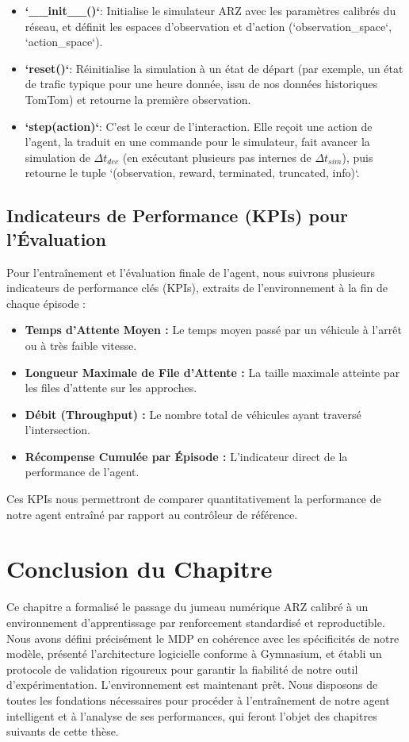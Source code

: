\begin{itemize}
    \item \textbf{`\_\_init\_\_()`}: Initialise le simulateur ARZ avec les paramètres calibrés du réseau, et définit les espaces d'observation et d'action (`observation\_space`, `action\_space`).
    \item \textbf{`reset()`}: Réinitialise la simulation à un état de départ (par exemple, un état de trafic typique pour une heure donnée, issu de nos données historiques TomTom) et retourne la première observation.
    \item \textbf{`step(action)`}: C'est le cœur de l'interaction. Elle reçoit une action de l'agent, la traduit en une commande pour le simulateur, fait avancer la simulation de $\Delta t_{dec}$ (en exécutant plusieurs pas internes de $\Delta t_{sim}$), puis retourne le tuple `(observation, reward, terminated, truncated, info)`.
\end{itemize}


\subsection{Indicateurs de Performance (KPIs) pour l'Évaluation}
\label{subsec:kpi_evaluation}
Pour l'entraînement et l'évaluation finale de l'agent, nous suivrons plusieurs indicateurs de performance clés (KPIs), extraits de l'environnement à la fin de chaque épisode :
\begin{itemize}
    \item \textbf{Temps d'Attente Moyen :} Le temps moyen passé par un véhicule à l'arrêt ou à très faible vitesse.
    \item \textbf{Longueur Maximale de File d'Attente :} La taille maximale atteinte par les files d'attente sur les approches.
    \item \textbf{Débit (Throughput) :} Le nombre total de véhicules ayant traversé l'intersection.
    \item \textbf{Récompense Cumulée par Épisode :} L'indicateur direct de la performance de l'agent.
\end{itemize}
Ces KPIs nous permettront de comparer quantitativement la performance de notre agent entraîné par rapport au contrôleur de référence.

\section{Conclusion du Chapitre}
\label{sec:conclusion_conception_rl}

Ce chapitre a formalisé le passage du jumeau numérique ARZ calibré à un environnement d'apprentissage par renforcement standardisé et reproductible. Nous avons défini précisément le MDP en cohérence avec les spécificités de notre modèle, présenté l'architecture logicielle conforme à Gymnasium, et établi un protocole de validation rigoureux pour garantir la fiabilité de notre outil d'expérimentation. L'environnement est maintenant prêt. Nous disposons de toutes les fondations nécessaires pour procéder à l'entraînement de notre agent intelligent et à l'analyse de ses performances, qui feront l'objet des chapitres suivants de cette thèse.